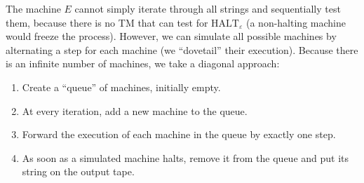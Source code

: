 The machine \(E\) cannot simply iterate through all strings and sequentially test them, because there is no TM that can test for \(\text{HALT}_\varepsilon\) (a non-halting machine would freeze the process). However, we can simulate all possible machines by alternating a step for each machine (we ``dovetail'' their execution). Because there is an infinite number of machines, we take a diagonal approach:
\begin{enumerate}
    \item Create a ``queue'' of machines, initially empty.
    \item At every iteration, add a new machine to the queue.
    \item Forward the execution of each machine in the queue by exactly one step.
    \item As soon as a simulated machine halts, remove it from the queue and put its string on the output tape.
\end{enumerate}

